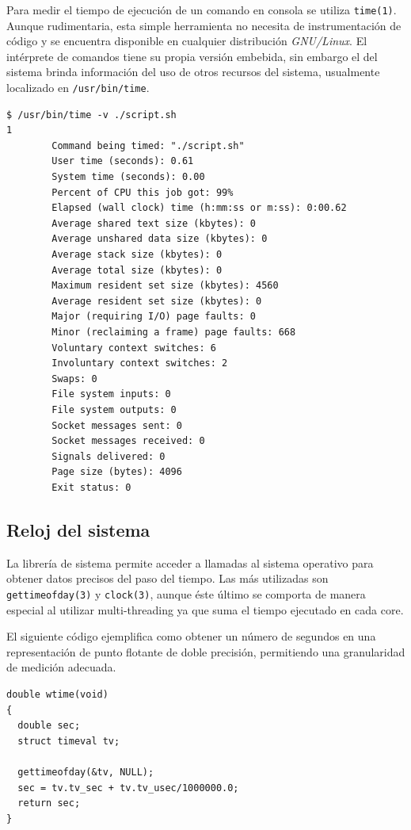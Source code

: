 \documentclass[a4paper]{report}
\begin{document}
Para medir el tiempo de ejecución de un comando en consola se utiliza {\tt time(1)}. Aunque rudimentaria, esta simple herramienta no necesita de instrumentación de código y se encuentra disponible en cualquier distribución {\it GNU/Linux}.
El intérprete de comandos tiene su propia versión embebida, sin embargo el del sistema brinda información del uso de otros recursos del sistema, usualmente localizado en {\tt /usr/bin/time}.

\bigskip

\begin{lstlisting}
$ /usr/bin/time -v ./script.sh
1
        Command being timed: "./script.sh"
        User time (seconds): 0.61
        System time (seconds): 0.00
        Percent of CPU this job got: 99%
        Elapsed (wall clock) time (h:mm:ss or m:ss): 0:00.62
        Average shared text size (kbytes): 0
        Average unshared data size (kbytes): 0
        Average stack size (kbytes): 0
        Average total size (kbytes): 0
        Maximum resident set size (kbytes): 4560
        Average resident set size (kbytes): 0
        Major (requiring I/O) page faults: 0
        Minor (reclaiming a frame) page faults: 668
        Voluntary context switches: 6
        Involuntary context switches: 2
        Swaps: 0
        File system inputs: 0
        File system outputs: 0
        Socket messages sent: 0
        Socket messages received: 0
        Signals delivered: 0
        Page size (bytes): 4096
        Exit status: 0
\end{lstlisting}

\subsection{Reloj del sistema}

La librería de sistema permite acceder a llamadas al sistema operativo para obtener datos precisos del paso del tiempo.
Las más utilizadas son {\tt gettimeofday(3)} y {\tt clock(3)}, aunque éste último se comporta de manera especial al utilizar multi-threading ya que suma el tiempo ejecutado en cada core.

\bigskip

El siguiente código ejemplifica como obtener un número de segundos en una representación de punto flotante de doble precisión, permitiendo una granularidad de medición adecuada.

\begin{lstlisting}
double wtime(void)
{
  double sec;
  struct timeval tv;
  
  gettimeofday(&tv, NULL);
  sec = tv.tv_sec + tv.tv_usec/1000000.0;
  return sec;
}
\end{lstlisting}
\end{document}
